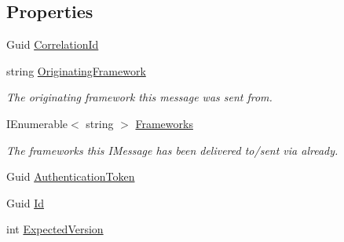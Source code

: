 \subsection*{Properties}
\begin{DoxyCompactItemize}
\item 
Guid \hyperlink{classCqrs_1_1Akka_1_1Tests_1_1Unit_1_1Commands_1_1UpdateCompletedConversationReportCommand_a31a479ec0cf27ea2989c371f51257136}{Correlation\+Id}
\item 
string \hyperlink{classCqrs_1_1Akka_1_1Tests_1_1Unit_1_1Commands_1_1UpdateCompletedConversationReportCommand_a5f954bf75f49918ab48c3a09df50111f}{Originating\+Framework}
\begin{DoxyCompactList}\small\item\em The originating framework this message was sent from. \end{DoxyCompactList}\item 
I\+Enumerable$<$ string $>$ \hyperlink{classCqrs_1_1Akka_1_1Tests_1_1Unit_1_1Commands_1_1UpdateCompletedConversationReportCommand_a8074ae409596c6e5d46e363adbfb9354}{Frameworks}
\begin{DoxyCompactList}\small\item\em The frameworks this I\+Message has been delivered to/sent via already. \end{DoxyCompactList}\item 
Guid \hyperlink{classCqrs_1_1Akka_1_1Tests_1_1Unit_1_1Commands_1_1UpdateCompletedConversationReportCommand_acd3a75723758c361da638f40fab6d574}{Authentication\+Token}
\item 
Guid \hyperlink{classCqrs_1_1Akka_1_1Tests_1_1Unit_1_1Commands_1_1UpdateCompletedConversationReportCommand_ae04217f6bfc19727e462f0077b990b34}{Id}
\item 
int \hyperlink{classCqrs_1_1Akka_1_1Tests_1_1Unit_1_1Commands_1_1UpdateCompletedConversationReportCommand_a9e691733ed2512c198da8ad934bd79cb}{Expected\+Version}
\end{DoxyCompactItemize}


